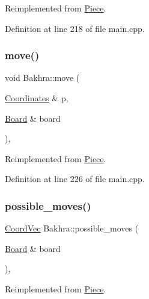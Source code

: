 Reimplemented from \mbox{\hyperlink{class_piece_a2f3261b1482b5635b6aa0bf67c588b98}{Piece}}.



Definition at line 218 of file main.\+cpp.

\mbox{\label{class_bakhra_ad70dced66c2d952d6268ae12d4ebd4f0}} 
\subsubsection{\texorpdfstring{move()}{move()}}
{\footnotesize\ttfamily void Bakhra\+::move (\begin{DoxyParamCaption}\item[{\mbox{\hyperlink{class_coordinates}{Coordinates}} \&}]{p,  }\item[{\mbox{\hyperlink{class_board}{Board}} \&}]{board }\end{DoxyParamCaption})\hspace{0.3cm}{\ttfamily [inline]}, {\ttfamily [virtual]}}



Reimplemented from \mbox{\hyperlink{class_piece_a926422c76f09a9f0df374462ad8d13c1}{Piece}}.



Definition at line 226 of file main.\+cpp.

\mbox{\label{class_bakhra_a1df8a0eaf723807f8293d97edf701d46}} 
\subsubsection{\texorpdfstring{possible\_moves()}{possible\_moves()}}
{\footnotesize\ttfamily \mbox{\hyperlink{main_8cpp_a267937870648899c879128d3199195ec}{Coord\+Vec}} Bakhra\+::possible\+\_\+moves (\begin{DoxyParamCaption}\item[{\mbox{\hyperlink{class_board}{Board}} \&}]{board }\end{DoxyParamCaption})\hspace{0.3cm}{\ttfamily [inline]}, {\ttfamily [virtual]}}



Reimplemented from \mbox{\hyperlink{class_piece_aaf451c6593a2ed62f8ebe73ba13c0419}{Piece}}.



